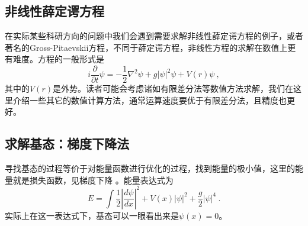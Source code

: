 
\begin{issues}
\issueTODO
\end{issues}

\subsection{非线性薛定谔方程}
在实际某些科研方向的问题中我们会遇到需要求解非线性薛定谔方程的例子，或者著名的Gross-Pitaevskii方程，不同于薛定谔方程，非线性方程的求解在数值上更有难度。方程的一般形式是
\begin{equation}
i \frac{\partial}{\partial t} \psi = -\frac{1}{2}\nabla^2 \psi + g |\psi|^2 \psi + V(r)\psi~,
\end{equation}
其中的$V(r)$是外势。读者可能会考虑诸如有限差分法等数值方法求解，我们在这里介绍一些其它的数值计算方法，通常运算速度要优于有限差分法，且精度也更好。
\subsection{求解基态：梯度下降法}
寻找基态的过程等价于对能量函数进行优化的过程，找到能量的极小值，这里的能量就是损失函数，见梯度下降 。能量表达式为
\begin{equation}
E = \int \frac{1}{2}|\frac{d \psi}{dx}|^2 + V(x)|\psi|^2 + \frac{g}{2}|\psi|^4~.
\end{equation}
实际上在这一表达式下，基态可以一眼看出来是$\psi(x) = 0$。

